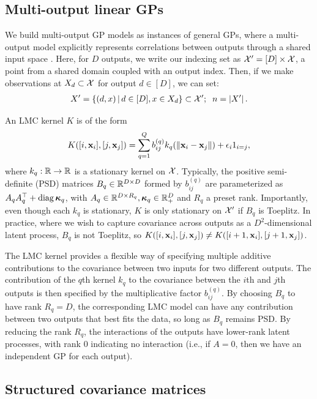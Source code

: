 \documentclass{article}
\begin{document}
\subsection{Multi-output linear GPs}

We build multi-output GP models as instances of general GPs, where a multi-output model explicitly represents correlations between outputs through a shared input space \cite{alvarez2012kernels}. Here, for $D$ outputs, we write our indexing set as $\mathcal{X}'=[D]\times \mathcal{X}$, a point from a shared domain coupled with an output index. Then, if we make observations at $X_d\subset\mathcal{X}$ for output $d\in[D]$, we can set:
\begin{align*}
X'=\left\{ (d, x) \,\middle|\, d\in[D],x\in X_d \right\}\subset{\mathcal{X}'};\;\; n=\left\vert{X'}\right\vert.
\end{align*}

An LMC kernel $K$ is of the form 
\begin{align}
K([i,\textbf{x}_i],[j,\textbf{x}_j])=\sum_{q=1}^Qb_{ij}^{(q)}k_q(\left\| \textbf{x}_i-\textbf{x}_j \right\|)+\epsilon_i1_{i=j},\label{lmcpointwise}
\end{align} 
where $k_q:\mathbb{R}\rightarrow\mathbb{R}$ is a stationary kernel on $\mathcal{X}$. Typically, the positive semi-definite (PSD) matrices $B_q\in\mathbb{R}^{D\times D}$ formed by $b_{ij}^{(q)}$ are parameterized as $A_qA_q^\top+\operatorname{diag}{\boldsymbol\kappa}_q$, with $A_q\in\mathbb{R}^{D\times R_q},{\boldsymbol\kappa}_q\in\mathbb{R}_+^D$ and $R_q$ a preset rank. Importantly, even though each $k_q$ is stationary, $K$ is only stationary on $\mathcal{X}'$ if $B_q$ is Toeplitz. In practice, where we wish to capture covariance across outputs as a $D^2$-dimensional latent process, $B_q$ is not Toeplitz, so $K([i,\textbf{x}_i],[j,\textbf{x}_j])\neq K([i+1,\textbf{x}_i],[j+1,\textbf{x}_j])$.

The LMC kernel provides a flexible way of specifying multiple additive contributions to the covariance between two inputs for two different outputs. The contribution of the $q$th kernel $k_q$ to the covariance between the $i$th and $j$th outputs is then specified by the multiplicative factor $b_{ij}^{(q)}$. By choosing $B_q$ to have rank $R_q=D$, the corresponding LMC model can have any contribution between two outputs that best fits the data, so long as $B_q$ remains PSD. By reducing the rank $R_q$, the interactions of the outputs have lower-rank latent processes, with rank 0 indicating no interaction (i.e., if $A=0$, then we have an independent GP for each output).

\subsection{Structured covariance matrices}
\end{document}
